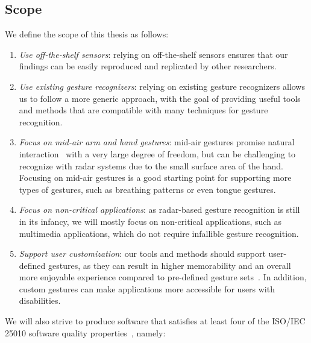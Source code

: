 \subsection{Scope}
We define the scope of this thesis as follows:
\begin{enumerate}[label=\textit{S\arabic*}]
    \item \textit{Use off-the-shelf sensors}: relying on off-the-shelf sensors ensures that our findings can be easily reproduced and replicated by other researchers.
    \item \textit{Use existing gesture recognizers}: relying on existing gesture recognizers allows us to follow a more generic approach, with the goal of providing useful tools and methods that are compatible with many techniques for gesture recognition.
    \item \textit{Focus on mid-air arm and hand gestures}: mid-air gestures promise natural interaction~\cite{Wigdor:2011} with a very large degree of freedom, but can be challenging to recognize with radar systems due to the small surface area of the hand. Focusing on mid-air gestures is a good starting point for supporting more types of gestures, such as breathing patterns or even tongue gestures.
    \item \textit{Focus on non-critical applications}: as radar-based gesture recognition is still in its infancy, we will mostly focus on non-critical applications, such as multimedia applications, which do not require infallible gesture recognition.
    \item \textit{Support user customization}: our tools and methods should support user-defined gestures, as they can result in higher memorability and an overall more enjoyable experience compared to pre-defined gesture sets~\cite{Nacenta:2013}. In addition, custom gestures can make applications more accessible for users with disabilities.
\end{enumerate}
We will also strive to produce software that satisfies at least four of the ISO/IEC 25010 software quality properties~\cite{iso25010}, namely:
